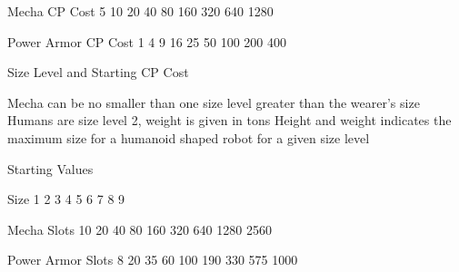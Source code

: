 \documentclass[twoside]{book}
\begin{document}
                      
                       Mecha CP Cost   
                       5   
                       10   
                       20   
                       40   
                       80   
                       160   
                       320   
                       640   
                       1280   
                      
                      
                       Power Armor CP Cost   
                       1   
                       4   
                       9   
                       16   
                       25   
                       50   
                       100   
                       200   
                       400   
                      
                    
                  Size Level and Starting CP Cost  
                  
                  
                     Mecha can be no smaller than one size level
                     greater than the wearer’s size 
                     Humans are size level 2, weight is given in
                     tons 
                     Height and weight indicates the maximum size
                     for a humanoid shaped robot for a given size level
                     
                  
                
                
                Starting Values  
                  
                    
                      
                       Size   
                       1 
                       2 
                       3   
                       4 
                       5 
                       6   
                       7 
                       8 
                       9   
                      
                      
                       Mecha Slots   
                       10   
                       20   
                       40   
                       80   
                       160   
                       320   
                       640   
                       1280   
                       2560   
                      
                      
                       Power Armor Slots   
                       8   
                       20   
                       35   
                       60   
                       100   
                       190   
                       330   
                       575   
                       1000   
                      
\end{document}

